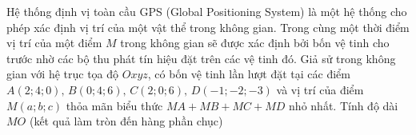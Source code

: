 \begin{ex}%
Hệ thống định vị toàn cầu GPS (Global Positioning System) là một hệ thống cho phép xác định vị trí của một vật thể trong không gian. Trong cùng một thời điểm vị trí của một điểm $ M$ trong không gian sẽ được xác định bởi bốn vệ tinh cho trước nhờ các bộ thu phát tín hiệu đặt trên các vệ tinh đó. Giả sử trong không gian với hệ trục tọa độ $ Oxyz$, có bốn vệ tinh lần lượt đặt tại các điểm $ A\left(2;4;0\right),\,B\left(0;4;6\right),\,C\left(2;0;6\right),\,D\left(-1;-2;-3\right)$ và vị trí của điểm $ M\left(a;b;c\right)$ thỏa mãn biểu thức $ MA+MB+MC+MD$ nhỏ nhất. Tính độ dài $ MO$ (kết quả làm tròn đến hàng phần chục)
\end{ex}

